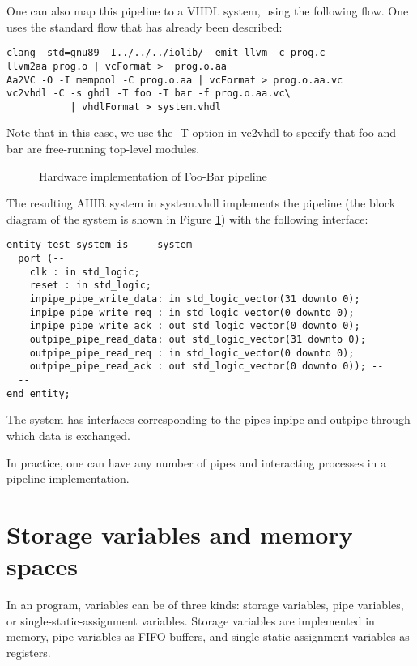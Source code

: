 One can also map this pipeline to a VHDL system, using the
following flow.  One uses the standard flow that has already
been described:
\begin{verbatim}
clang -std=gnu89 -I../../../iolib/ -emit-llvm -c prog.c
llvm2aa prog.o | vcFormat >  prog.o.aa
Aa2VC -O -I mempool -C prog.o.aa | vcFormat > prog.o.aa.vc
vc2vhdl -C -s ghdl -T foo -T bar -f prog.o.aa.vc\
           | vhdlFormat > system.vhdl
\end{verbatim}
Note that in this case, we use the -T option in vc2vhdl to
specify that foo and bar are free-running top-level modules.
\begin{figure}
\begin{centering}
\centerline{}
\caption{Hardware implementation of Foo-Bar pipeline}
 \label{fig:FooBarPipeline}
\end{centering}
\end{figure}
The resulting AHIR system in system.vhdl implements the pipeline
(the block diagram of the system is shown in Figure \ref{fig:FooBarPipeline})
with the following interface:
\begin{verbatim}
entity test_system is  -- system 
  port (-- 
    clk : in std_logic;
    reset : in std_logic;
    inpipe_pipe_write_data: in std_logic_vector(31 downto 0);
    inpipe_pipe_write_req : in std_logic_vector(0 downto 0);
    inpipe_pipe_write_ack : out std_logic_vector(0 downto 0);
    outpipe_pipe_read_data: out std_logic_vector(31 downto 0);
    outpipe_pipe_read_req : in std_logic_vector(0 downto 0);
    outpipe_pipe_read_ack : out std_logic_vector(0 downto 0)); -- 
  -- 
end entity;
\end{verbatim}
The system has interfaces corresponding to the pipes inpipe and
outpipe through which data is exchanged.

In practice, one can have any number of pipes and 
interacting processes in a pipeline implementation.


\section{Storage variables and memory spaces}


In an \Aa program, variables can be of three kinds:
storage variables, pipe variables, or single-static-assignment
variables.  Storage variables are implemented in memory,
pipe variables as FIFO buffers, and single-static-assignment
variables as registers.  

